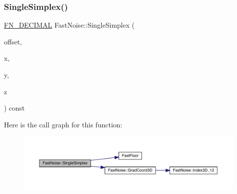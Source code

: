 \subsubsection{\texorpdfstring{Single\+Simplex()}{SingleSimplex()}\hspace{0.1cm}{\footnotesize\ttfamily [2/3]}}
{\footnotesize\ttfamily \mbox{\hyperlink{_fast_noise_8h_a75a9ef6d2541c4921815b885bfd449c3}{F\+N\+\_\+\+D\+E\+C\+I\+M\+AL}} Fast\+Noise\+::\+Single\+Simplex (\begin{DoxyParamCaption}\item[{unsigned char}]{offset,  }\item[{\mbox{\hyperlink{_fast_noise_8h_a75a9ef6d2541c4921815b885bfd449c3}{F\+N\+\_\+\+D\+E\+C\+I\+M\+AL}}}]{x,  }\item[{\mbox{\hyperlink{_fast_noise_8h_a75a9ef6d2541c4921815b885bfd449c3}{F\+N\+\_\+\+D\+E\+C\+I\+M\+AL}}}]{y,  }\item[{\mbox{\hyperlink{_fast_noise_8h_a75a9ef6d2541c4921815b885bfd449c3}{F\+N\+\_\+\+D\+E\+C\+I\+M\+AL}}}]{z }\end{DoxyParamCaption}) const\hspace{0.3cm}{\ttfamily [private]}}

Here is the call graph for this function\+:
\nopagebreak
\begin{figure}[H]
\begin{center}
\leavevmode
\includegraphics[width=350pt]{class_fast_noise_a5e40c643992d4099dbe7f0a5be6460e7_cgraph}
\end{center}
\end{figure}
\mbox{\label{class_fast_noise_a1f05efc093f8c7998014dfc3b77e0753}} 
